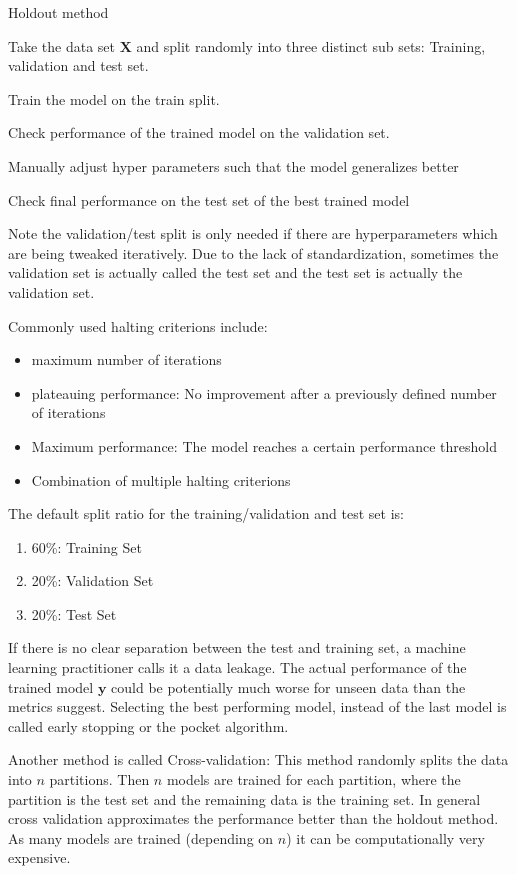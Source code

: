 \documentclass[draft,final,oneside]{vutinfth} %
\begin{document}
\begin{algorithm}
\caption{Holdout method}\label{holdoutalgo}
Take the data set $\boldsymbol{X}$ and split randomly into three distinct sub sets: Training, validation and test set.

 {
Train the model on the train split.

Check performance of the trained model on the validation set.

Manually adjust hyper parameters such that the model generalizes better
}

Check final performance on the test set of the best trained model

\end{algorithm}

Note the validation/test split is only needed if there are hyperparameters which are being tweaked iteratively.
Due to the lack of standardization, sometimes the validation set is actually called the test set and the test set is actually the validation set.

Commonly used halting criterions include:
\begin{itemize}
\item maximum number of iterations
\item plateauing performance: No improvement after a previously defined number of iterations
\item Maximum performance: The model reaches a certain performance threshold
\item Combination of multiple halting criterions
\end{itemize}

The default split ratio for the training/validation and test set is:
\begin{enumerate}
\item 60\%: Training Set
\item 20\%: Validation Set
\item 20\%: Test Set
\end{enumerate}

If there is no clear separation between the test and training set, a machine learning practitioner calls it a data leakage. The actual performance of the trained model $\boldsymbol{y}$ could be potentially much worse for unseen data than the metrics suggest. Selecting the best performing model, instead of the last model is called early stopping or the pocket algorithm.

Another method is called Cross-validation: This method randomly splits the data into $n$ partitions. Then $n$ models are trained for each partition, where the partition is the test set and the remaining data is the training set. In general cross validation approximates the performance better than the holdout method. As many models are trained (depending on $n$) it can be computationally very expensive.
\end{document}
